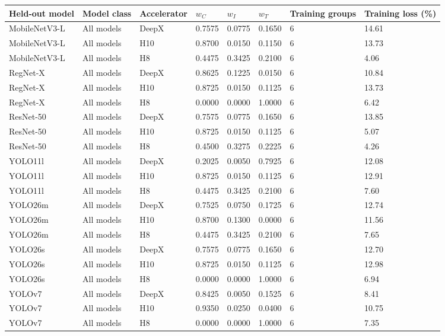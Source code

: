 \begin{tabular}{@{}llllllll@{}}
\toprule
Held-out model & Model class & Accelerator & $w_C$ & $w_I$ & $w_T$ & Training groups & Training loss (\%) \\
\midrule
MobileNetV3-L & All models & DeepX & 0.7575 & 0.0775 & 0.1650 & 6 & 14.61 \\
MobileNetV3-L & All models & H10 & 0.8700 & 0.0150 & 0.1150 & 6 & 13.73 \\
MobileNetV3-L & All models & H8 & 0.4475 & 0.3425 & 0.2100 & 6 & 4.06 \\
RegNet-X & All models & DeepX & 0.8625 & 0.1225 & 0.0150 & 6 & 10.84 \\
RegNet-X & All models & H10 & 0.8725 & 0.0150 & 0.1125 & 6 & 13.73 \\
RegNet-X & All models & H8 & 0.0000 & 0.0000 & 1.0000 & 6 & 6.42 \\
ResNet-50 & All models & DeepX & 0.7575 & 0.0775 & 0.1650 & 6 & 13.85 \\
ResNet-50 & All models & H10 & 0.8725 & 0.0150 & 0.1125 & 6 & 5.07 \\
ResNet-50 & All models & H8 & 0.4500 & 0.3275 & 0.2225 & 6 & 4.26 \\
YOLO11l & All models & DeepX & 0.2025 & 0.0050 & 0.7925 & 6 & 12.08 \\
YOLO11l & All models & H10 & 0.8725 & 0.0150 & 0.1125 & 6 & 12.91 \\
YOLO11l & All models & H8 & 0.4475 & 0.3425 & 0.2100 & 6 & 7.60 \\
YOLO26m & All models & DeepX & 0.7525 & 0.0750 & 0.1725 & 6 & 12.74 \\
YOLO26m & All models & H10 & 0.8700 & 0.1300 & 0.0000 & 6 & 11.56 \\
YOLO26m & All models & H8 & 0.4475 & 0.3425 & 0.2100 & 6 & 7.65 \\
YOLO26s & All models & DeepX & 0.7575 & 0.0775 & 0.1650 & 6 & 12.70 \\
YOLO26s & All models & H10 & 0.8725 & 0.0150 & 0.1125 & 6 & 12.98 \\
YOLO26s & All models & H8 & 0.0000 & 0.0000 & 1.0000 & 6 & 6.94 \\
YOLOv7 & All models & DeepX & 0.8425 & 0.0050 & 0.1525 & 6 & 8.41 \\
YOLOv7 & All models & H10 & 0.9350 & 0.0250 & 0.0400 & 6 & 10.75 \\
YOLOv7 & All models & H8 & 0.0000 & 0.0000 & 1.0000 & 6 & 7.35 \\
\bottomrule
\end{tabular}
